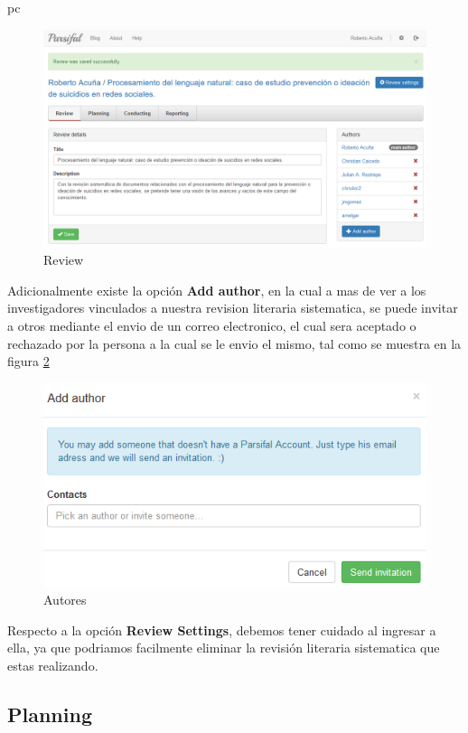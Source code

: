 pc\documentclass[a4paper,12pt,openany]{book}
\begin{document}
\begin{itemize}
        \begin{figure}[H]
        \centering
    	\includegraphics[width=12cm]{parsifal4.png}
        \caption{Review}
        \label{fig:Parcifal4}
        \end{figure}

Adicionalmente existe la opción \textbf{Add author}, en la cual a mas de ver a los investigadores vinculados a nuestra revision literaria sistematica, se puede invitar a otros mediante el envio de un correo electronico, el cual sera aceptado o rechazado por la persona  a la cual se le envio el mismo, tal como se muestra en la figura  \ref{fig:Parcifal5}

        \begin{figure}[H]
        \centering
    	\includegraphics[width=12cm]{parsifal5.png}
        \caption{Autores}
        \label{fig:Parcifal5}
        \end{figure}

Respecto a la opción \textbf{Review Settings}, debemos tener cuidado al ingresar a ella, ya que podriamos facilmente eliminar la revisión literaria sistematica que estas realizando.

\subsection{Planning}


\end{itemize}
\end{document}
